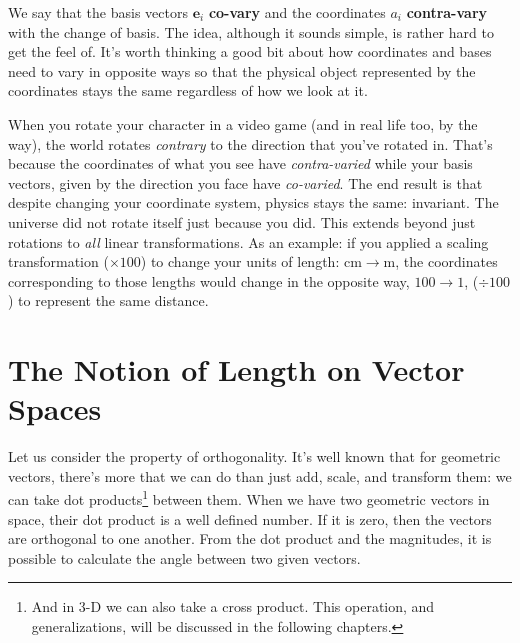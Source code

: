 \documentclass[../master.tex]{subfiles}
\begin{document}
	We say that the basis vectors $\mathbf e_i$ \textbf{co-vary} and the coordinates $a_i$ \textbf{contra-vary} with the change of basis. The idea, although it sounds simple, is rather hard to get the feel of. It's worth thinking a good bit about how coordinates and bases need to vary in opposite ways so that the physical object represented by the coordinates stays the same regardless of how we look at it. 
	
	
	 When you rotate your character in a video game (and in real life too, by the way), the world rotates \emph{contrary} to the direction that you've rotated in. That's because the coordinates of what you see have \emph{contra-varied} while your basis vectors, given by the direction you face have \emph{co-varied}. The end result is that despite changing your coordinate system, physics stays the same: invariant. The universe did not rotate itself just because you did. This extends beyond just rotations to \emph{all} linear transformations. As an example: if you applied a scaling transformation ($\times 100$) to change your units of length: $\mathrm {cm} \to \mathrm m$, the coordinates corresponding to those lengths would change in the opposite way, $100 \to 1$, ($\div 100$) to represent the same distance. \\
	
	
	\section{The Notion of Length on Vector Spaces} %
	\label{sec:the_notion_of_length_on_vector_spaces}
	
	Let us consider the property of orthogonality. It's well known that for geometric vectors, there's more that we can do than just add, scale, and transform them: we can take dot products\footnote{And in 3-D we can also take a cross product. This operation, and generalizations, will be discussed in the following chapters.} between them. When we have two geometric vectors in space, their dot product is a well defined number. If it is zero, then the vectors are orthogonal to one another. From the dot product and the magnitudes, it is possible to calculate the angle between two given vectors. 
	
\end{document}
